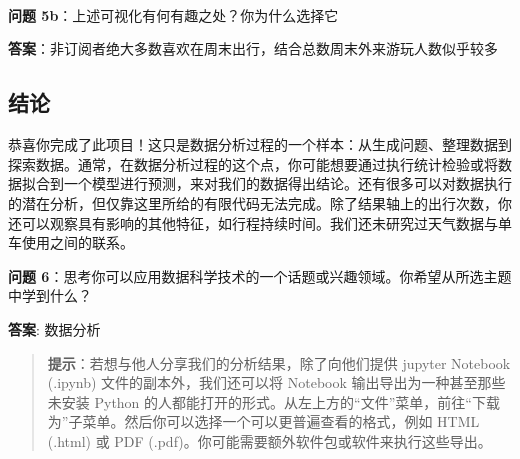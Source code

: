\documentclass[11pt]{article}
\begin{document}
    \begin{center}
    \end{center}
    { \hspace*{\fill} \\}
    
    \begin{center}
    \end{center}
    { \hspace*{\fill} \\}
    
    \begin{center}
    \end{center}
    { \hspace*{\fill} \\}
    
    \textbf{问题 5b}：上述可视化有何有趣之处？你为什么选择它

\textbf{答案}：非订阅者绝大多数喜欢在周末出行，结合总数周末外来游玩人数似乎较多

    \subsection{结论}\label{ux7ed3ux8bba}

恭喜你完成了此项目！这只是数据分析过程的一个样本：从生成问题、整理数据到探索数据。通常，在数据分析过程的这个点，你可能想要通过执行统计检验或将数据拟合到一个模型进行预测，来对我们的数据得出结论。还有很多可以对数据执行的潜在分析，但仅靠这里所给的有限代码无法完成。除了结果轴上的出行次数，你还可以观察具有影响的其他特征，如行程持续时间。我们还未研究过天气数据与单车使用之间的联系。

\textbf{问题
6}：思考你可以应用数据科学技术的一个话题或兴趣领域。你希望从所选主题中学到什么？

\textbf{答案}: 数据分析

\begin{quote}
\textbf{提示}：若想与他人分享我们的分析结果，除了向他们提供 jupyter
Notebook (.ipynb) 文件的副本外，我们还可以将 Notebook
输出导出为一种甚至那些未安装 Python
的人都能打开的形式。从左上方的``文件''菜单，前往``下载为''子菜单。然后你可以选择一个可以更普遍查看的格式，例如
HTML (.html) 或 PDF (.pdf)。你可能需要额外软件包或软件来执行这些导出。
\end{quote}


    
    
    
    
\end{document}
